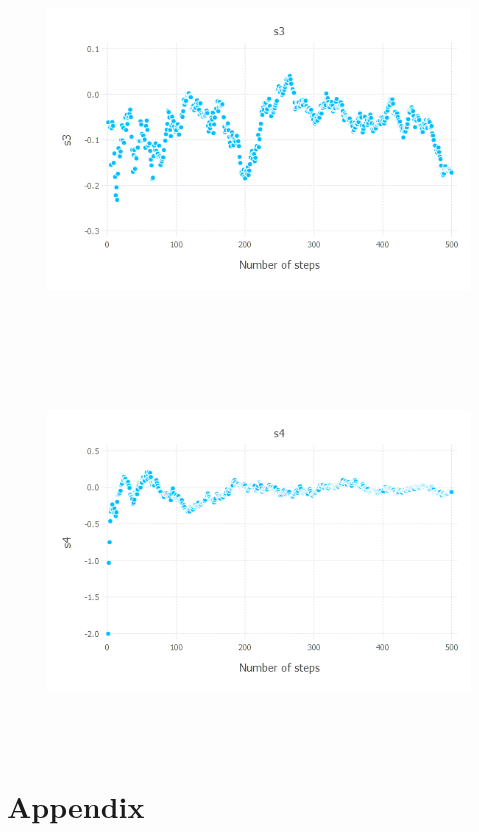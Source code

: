 \documentclass{article}
\begin{document}
\begin{figure}[H]
	\includegraphics[width=6in,height=4in]{"tr_mt"}
\end{figure}
\begin{figure}[H]
	\includegraphics[width=6in,height=4in]{"fr_mt"}
\end{figure}


\section*{Appendix}
\end{document}
